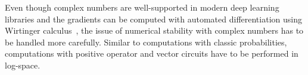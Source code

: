 
Even though complex numbers are well-supported in modern deep learning libraries and the gradients can be computed with automated differentiation using Wirtinger calculus~\cite{kreutz2009complex,wirtinger1927formalen}, the issue of numerical stability with complex numbers has to be handled more carefully.
Similar to computations with classic probabilities, computations with positive operator and vector circuits have to be performed in log-space.


